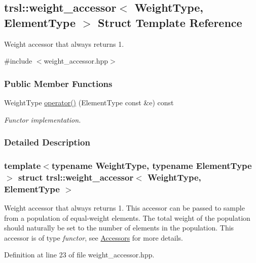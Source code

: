 \hypertarget{structtrsl_1_1weight__accessor}{
\subsection{trsl::weight\_\-accessor$<$ WeightType, ElementType $>$ Struct Template Reference}
\label{structtrsl_1_1weight__accessor}
}


Weight accessor that always returns 1.  


{\ttfamily \#include $<$weight\_\-accessor.hpp$>$}\subsubsection*{Public Member Functions}
\begin{DoxyCompactItemize}
\item 
WeightType \hyperlink{structtrsl_1_1weight__accessor_a2d2ff14708898b56d65c93223f413a17}{operator()} (ElementType const \&e) const 
\begin{DoxyCompactList}\small\item\em Functor implementation. \item\end{DoxyCompactList}\end{DoxyCompactItemize}


\subsubsection{Detailed Description}
\subsubsection*{template$<$typename WeightType, typename ElementType$>$ struct trsl::weight\_\-accessor$<$ WeightType, ElementType $>$}

Weight accessor that always returns 1. This accessor can be passed to sample from a population of equal-\/weight elements. The total weight of the population should naturally be set to the number of elements in the population. This accessor is of type {\itshape functor\/}, see \hyperlink{group__accessor}{Accessors} for more details. 

Definition at line 23 of file weight\_\-accessor.hpp.

